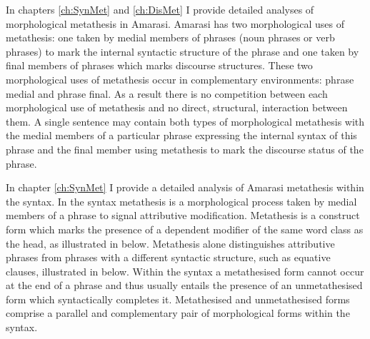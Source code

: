 In chapters \ref{ch:SynMet} and \ref{ch:DisMet}
I provide detailed analyses of morphological metathesis in Amarasi.
Amarasi has two morphological uses of metathesis:
one taken by medial members of phrases (noun phrases or verb phrases)
to mark the internal syntactic structure of the phrase
and one taken by final members of phrases
which marks discourse structures.
These two morphological uses of metathesis
occur in complementary environments:
phrase medial and phrase final.
As a result there is no competition
between each morphological use of metathesis
and no direct, structural, interaction between them.
A single sentence may contain both types of morphological
metathesis with the medial members of a particular
phrase expressing the internal syntax of this phrase
and the final member using metathesis to 
mark the discourse status of the phrase.

In chapter \ref{ch:SynMet} I provide a detailed analysis of Amarasi metathesis within the syntax.
In the syntax metathesis is a morphological process
taken by medial members of a phrase to signal attributive modification.
Metathesis is a construct form which marks the presence of a dependent
modifier of the same word class as the head, as illustrated in  below.
Metathesis alone distinguishes attributive phrases from
phrases with a different syntactic structure, such as equative clauses,
illustrated in  below.
Within the syntax a metathesised form cannot occur at the end of a phrase
and thus usually entails the presence of an unmetathesised form which syntactically completes it.
Metathesised and unmetathesised forms comprise a parallel
and complementary pair of morphological forms within the syntax.

\begin{multicols}{2}
	\begin{exe}
		\label{ex:Fatu+Koqu}
	\end{exe}
\end{multicols}

